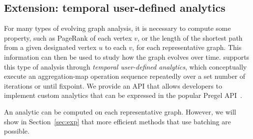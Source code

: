 \subsection{Extension: temporal user-defined analytics}
\label{sec:analytics}

For many types of evolving graph analysis, it is necessary to compute
some property, such as PageRank of each vertex $v$, or the length of
the shortest path from a given designated vertex $u$ to each $v$, for
each representative graph.  This information can then be used to study
how the graph evolves over time.  \ql supports this type of analysis
through {\em temporal user-defined analytics}, which conceptually
execute an aggregation-map operation sequence repeatedly over a set
number of iterations or until fixpoint.  We provide an API that allows developers to implement custom
analytics that can be expressed in the popular Pregel
API~\cite{DBLP:conf/sigmod/MalewiczABDHLC10}.

An analytic can be computed on each representative graph.  However, we
will show in Section~\ref{sec:exp} that more efficient methods that
use batching are possible.  
